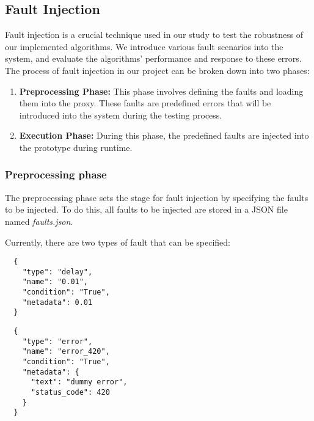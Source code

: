 \subsection{Fault Injection}
\label{subsec:fault_injection}


Fault injection is a crucial technique used in our study to test the robustness of our implemented algorithms. We introduce various fault scenarios into the system, and evaluate the algorithms' performance and response to these errors. 
The process of fault injection in our project can be broken down into two phases:

\begin{enumerate}
  \item \textbf{Preprocessing Phase:} This phase involves defining the faults
    and loading them into the proxy. These faults are predefined 
    errors that will be introduced into the system during the testing process. 
  \item \textbf{Execution Phase:} During this phase, the predefined faults are injected into the prototype during runtime. 
\end{enumerate}


\subsubsection{Preprocessing phase}
\label{subsubssec:preprocessing_phase}
The preprocessing phase sets the stage for fault injection by specifying the faults to be injected. 
To do this, all faults to be injected are stored in a JSON file named \textit{faults.json}.

Currently, there are two types of fault that can be specified:

\begin{multicols}{2}
  \begin{listing}[H]
    
  \begin{verbatim}
  {
    "type": "delay",
    "name": "0.01",
    "condition": "True",
    "metadata": 0.01
  }
  \end{verbatim}
  \caption{Delay type fault}
  \label{code:json_delay}
\end{listing}

  \columnbreak

  \begin{listing}[H]
  \begin{verbatim}
  {
    "type": "error",
    "name": "error_420",
    "condition": "True",
    "metadata": {
      "text": "dummy error",
      "status_code": 420
    }
  }
  \end{verbatim}
  \caption{Error type fault}
  \label{code:json_error}
\end{listing}
\end{multicols}

